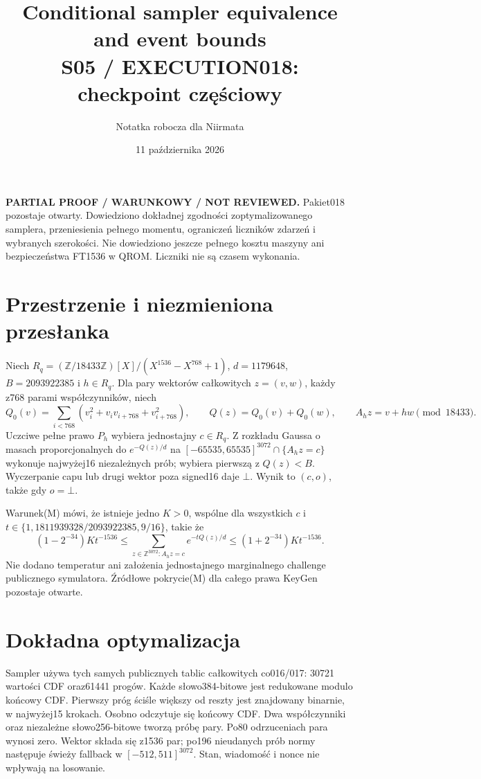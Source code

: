 \documentclass[11pt,a4paper]{article}
\title{Conditional sampler equivalence and event bounds\\\large S05 / EXECUTION018: checkpoint częściowy}
\author{Notatka robocza dla Niirmata}\date{11 października 2026}
\begin{document}
\maketitle
\textbf{PARTIAL PROOF / WARUNKOWY / NOT REVIEWED.}
Pakiet018 pozostaje otwarty. Dowiedziono dokładnej zgodności zoptymalizowanego
samplera, przeniesienia pełnego momentu, ograniczeń liczników zdarzeń i
wybranych szerokości. Nie dowiedziono jeszcze pełnego kosztu maszyny ani
bezpieczeństwa FT1536 w QROM. Liczniki nie są czasem wykonania.

\section{Przestrzenie i niezmieniona przesłanka}
Niech $R_q=(\mathbb Z/18433\mathbb Z)[X]/(X^{1536}-X^{768}+1)$,
$d=1179648$, $B=2093922385$ i $h\in R_q$. Dla pary wektorów całkowitych
$z=(v,w)$, każdy z768 parami współczynników, niech
\[
 Q_0(v)=\sum_{i<768}(v_i^2+v_iv_{i+768}+v_{i+768}^2),\qquad
 Q(z)=Q_0(v)+Q_0(w),\qquad A_hz=v+hw\pmod {18433}.
\]
Uczciwe pełne prawo $P_h$ wybiera jednostajny $c\in R_q$. Z rozkładu
Gaussa o masach proporcjonalnych do $e^{-Q(z)/d}$ na
$[-65535,65535]^{3072}\cap\{A_hz=c\}$ wykonuje najwyżej16 niezależnych
prób; wybiera pierwszą z $Q(z)<B$. Wyczerpanie capu lub drugi wektor poza
signed16 daje $\bot$. Wynik to $(c,o)$, także gdy $o=\bot$.

Warunek(M) mówi, że istnieje jedno $K>0$, wspólne dla wszystkich $c$ i
$t\in\{1,1811939328/2093922385,9/16\}$, takie że
\[
 (1-2^{-34})Kt^{-1536}\le
 \sum_{z\in\mathbb Z^{3072}:A_hz=c}e^{-tQ(z)/d}
 \le(1+2^{-34})Kt^{-1536}.
\]
Nie dodano temperatur ani założenia jednostajnego marginalnego challenge
publicznego symulatora. Źródłowe pokrycie(M) dla całego prawa KeyGen
pozostaje otwarte.

\section{Dokładna optymalizacja}
Sampler używa tych samych publicznych tablic całkowitych co016/017:
30721 wartości CDF oraz61441 progów. Każde słowo384-bitowe jest redukowane
modulo końcowy CDF. Pierwszy próg ściśle większy od reszty jest znajdowany
binarnie, w najwyżej15 krokach. Osobno odczytuje się końcowy CDF.
Dwa współczynniki oraz niezależne słowo256-bitowe tworzą próbę pary.
Po80 odrzuceniach para wynosi zero. Wektor składa się z1536 par;
po196 nieudanych prób normy następuje świeży fallback w
$[-512,511]^{3072}$. Stan, wiadomość i nonce nie wpływają na losowanie.
\end{document}
